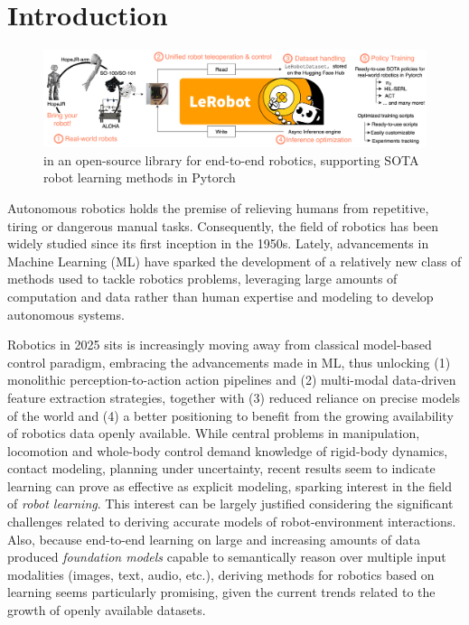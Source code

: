 \section{Introduction}

\begin{figure}
    \centering
    \includegraphics[width=\linewidth]{figures/ch1/ch1-lerobot-figure1.png}
    \caption{\lerobot in an open-source library for end-to-end robotics, supporting SOTA robot learning methods in Pytorch}
    \label{fig:figure1}
\end{figure}

Autonomous robotics holds the premise of relieving humans from repetitive, tiring or dangerous manual tasks. 
Consequently, the field of robotics has been widely studied since its first inception in the 1950s.
Lately, advancements in Machine Learning (ML) have sparked the development of a relatively new class of methods used to tackle robotics problems, leveraging large amounts of computation and data rather than human expertise and modeling to develop autonomous systems.

Robotics in 2025 sits is increasingly moving away from classical model-based control paradigm, embracing the advancements made in ML, thus unlocking (1) monolithic perception-to-action action pipelines and (2) multi-modal data-driven feature extraction strategies, together with (3) reduced reliance on precise models of the world and (4) a better positioning to benefit from the growing availability of robotics data openly available.
While central problems in manipulation, locomotion and whole-body control demand knowledge of rigid-body dynamics, contact modeling, planning under uncertainty, recent results seem to indicate learning can prove as effective as explicit modeling, sparking interest in the field of \emph{robot learning}.
This interest can be largely justified considering the significant challenges related to deriving accurate models of robot-environment interactions.
Also, because end-to-end learning on large and increasing amounts of data produced \emph{foundation models} capable to semantically reason over multiple input modalities (images, text, audio, etc.), deriving methods for robotics based on learning seems particularly promising, given the current trends related to the growth of openly available datasets.

